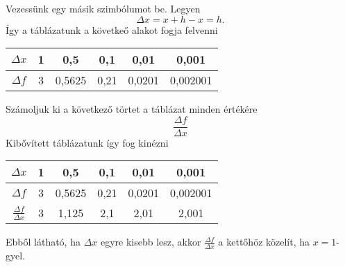 \documentclass[11pt, a4paper]{article}
\begin{document}
Vezessünk egy m\'asik szimb\'olumot be. Legyen
\[
    \Delta x = x+h - x = h.
\]
\'Igy a t\'abl\'azatunk a követke\H{o} alakot fogja felvenni
\begin{center}
\begin{tabular}{ c|c|c|c|c|c } 
    $\Delta x$ & 1 & 0,5    & 0,1  & 0,01   & 0,001 \\ 
 \hline
    $\Delta f$ & 3 & 0,5625 & 0,21 & 0,0201 & 0,002001 \\
\end{tabular}
\end{center}
Sz\'amoljuk ki a következ\H{o} törtet a t\'abl\'azat minden \'ert\'ek\'ere
\[
    \frac{\Delta f}{\Delta x}
\]
Kib\H{o}v\'itett t\'abl\'azatunk \'igy fog kin\'ezni 
\begin{center}
\begin{tabular}{ c|c|c|c|c|c } 
    $\Delta x$                  & 1 & 0,5     & 0,1  & 0,01   & 0,001 \\ 
 \hline
    $\Delta f$                  & 3 & 0,5625  & 0,21 & 0,0201 & 0,002001 \\
 \hline
  $\frac{\Delta f}{\Delta x}$ & 3 & 1,125   & 2,1  & 2,01   & 2,001 \\
\end{tabular}
\end{center}
Ebb\H{o}l l\'athat\'o, ha $\Delta x$ egyre kisebb lesz, akkor $\frac{\Delta f}{\Delta x}$ a kett\H{o}höz közel\'it, ha $x=1$-gyel.
\end{document}
